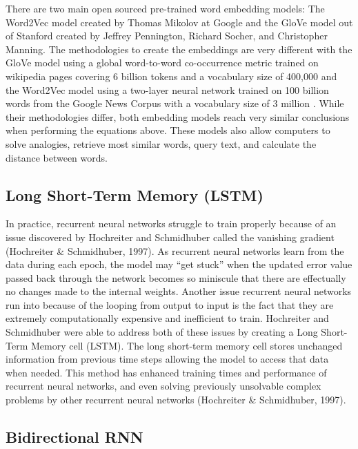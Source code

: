 \documentclass[5p,authoryear]{elsarticle}
\begin{document}
There are two main open sourced pre-trained word embedding models: The Word2Vec model created by Thomas Mikolov at Google and the GloVe model out of Stanford created by Jeffrey Pennington, Richard Socher, and Christopher Manning. The methodologies to create the embeddings are very different with the GloVe model using a global word-to-word co-occurrence metric trained on wikipedia pages covering 6 billion tokens and a vocabulary size of 400,000 \citep{glove} and the Word2Vec model using a two-layer neural network trained on 100 billion words from the Google News Corpus with a vocabulary size of 3 million \citep{word2vec}. While their methodologies differ, both embedding models reach very similar conclusions when performing the equations above. These models also allow computers to solve analogies, retrieve most similar words, query text, and calculate the distance between words.



\subsection{Long Short-Term Memory (LSTM)}\label{LSTM}

In practice, recurrent neural networks struggle to train properly because of an issue discovered by Hochreiter and Schmidhuber called the vanishing gradient (Hochreiter & Schmidhuber, 1997). As recurrent neural networks learn from the data during each epoch, the model may “get stuck” when the updated error value passed back through the network becomes so miniscule that there are effectually no changes made to the internal weights. Another issue recurrent neural networks run into because of the looping from output to input is the fact that they are extremely computationally expensive and inefficient to train. Hochreiter and Schmidhuber were able to address both of these issues by creating a Long Short-Term Memory cell (LSTM). The long short-term memory cell stores unchanged information from previous time steps allowing the model to access that data when needed. This method has enhanced training times and performance of recurrent neural networks, and even solving previously unsolvable complex problems by other recurrent neural networks (Hochreiter & Schmidhuber, 1997).




\subsection{Bidirectional RNN}\label{BiRNN}
\end{document}
